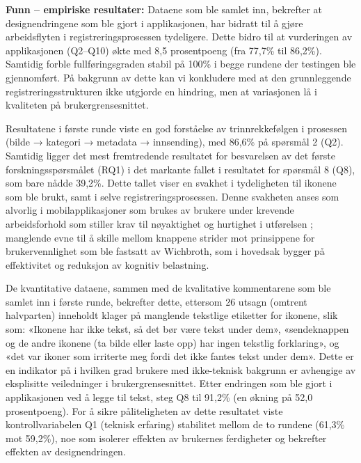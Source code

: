 \textbf{Funn – empiriske resultater: } Dataene som ble samlet inn, bekrefter at designendringene som ble gjort i applikasjonen, har bidratt til å gjøre arbeidsflyten i registreringsprosessen tydeligere. Dette bidro til at vurderingen av applikasjonen (Q2–Q10) økte med 8,5 prosentpoeng (fra 77,7\% til 86,2\%). Samtidig forble fullføringsgraden stabil på 100\% i begge rundene der testingen ble gjennomført. På bakgrunn av dette kan vi konkludere med at den grunnleggende registreringsstrukturen ikke utgjorde en hindring, men at variasjonen lå i kvaliteten på brukergrensesnittet.

Resultatene i første runde viste en god forståelse av trinnrekkefølgen i prosessen (bilde → kategori → metadata → innsending), med 86,6\% på spørsmål 2 (Q2). Samtidig ligger det mest fremtredende resultatet for besvarelsen av det første forskningsspørsmålet (RQ1) i det markante fallet i resultatet for spørsmål 8 (Q8), som bare nådde 39,2\%. Dette tallet viser en svakhet i tydeligheten til ikonene som ble brukt, samt i selve registreringsprosessen. Denne svakheten anses som alvorlig i mobilapplikasjoner som brukes av brukere under krevende arbeidsforhold som stiller krav til nøyaktighet og hurtighet i utførelsen \cite{muller2024, wenz2023}; manglende evne til å skille mellom knappene strider mot prinsippene for brukervennlighet som ble fastsatt av Wichbroth\cite{weichbroth2024}, som i hovedsak bygger på effektivitet og reduksjon av kognitiv belastning.

De kvantitative dataene, sammen med de kvalitative kommentarene som ble samlet inn i første runde, bekrefter dette, ettersom 26 utsagn (omtrent halvparten) inneholdt klager på manglende tekstlige etiketter for ikonene, slik som: «Ikonene har ikke tekst, så det bør være tekst under dem», «sendeknappen og de andre ikonene (ta bilde eller laste opp) har ingen tekstlig forklaring», og «det var ikoner som irriterte meg fordi det ikke fantes tekst under dem». Dette er en indikator på i hvilken grad brukere med ikke-teknisk bakgrunn er avhengige av eksplisitte veiledninger i brukergrensesnittet. Etter endringen som ble gjort i applikasjonen ved å legge til tekst, steg Q8 til 91,2\% (en økning på 52,0 prosentpoeng). For å sikre påliteligheten av dette resultatet viste kontrollvariabelen Q1 (teknisk erfaring) stabilitet mellom de to rundene (61,3\% mot 59,2\%), noe som isolerer effekten av brukernes ferdigheter og bekrefter effekten av designendringen.

